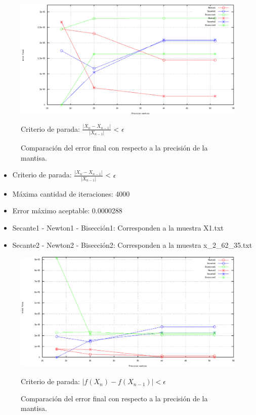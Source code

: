 \documentclass[10pt, a4paper]{article}
\begin{document}
\begin{figure}[H] %
\begin{center}
\includegraphics[width=370pt]{./error3.png}
\caption[h]{Comparaci\'on del error final con respecto a la precisi\'on de la mantisa.}{Criterio de parada: $\frac{|X_{n} - X_{n-1}|}{|X_{n-1}|}$ < $\epsilon$}
\end{center}
\end{figure}

\begin{itemize}
\item Criterio de parada: $\frac{|X_{n} - X_{n-1}|}{|X_{n-1}|}$ < $\epsilon$
\item M\'axima cantidad de iteraciones: 4000
\item Error m\'aximo aceptable: 0.0000288
\item Secante1 - Newton1 - Bisecci\'on1: Corresponden a la muestra X1.txt
\item Secante2 - Newton2 - Bisecci\'on2: Corresponden a la muestra x\_2\_62\_35.txt
\end{itemize}



\begin{figure}[H] %
\begin{center}
\includegraphics[width=370pt]{./error4.png}
\caption[h]{Comparaci\'on del error final con respecto a la precisi\'on de la mantisa.}{Criterio de parada: $|f(X_{n}) - f(X_{n-1})| < \epsilon$}
\end{center}
\end{figure}
\end{document}
